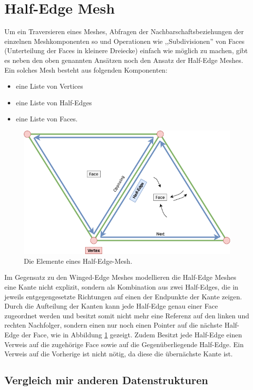\section{Half-Edge Mesh}
Um ein Traversieren eines Meshes, Abfragen der Nachbarschaftsbeziehungen der einzelnen Meshkomponenten so und Operationen wie ,,Subdivisionen'' von Faces (Unterteilung der Faces in kleinere Dreiecke) einfach wie m\"oglich zu machen, gibt es neben den oben genannten Ans\"atzen noch den Ansatz der Half-Edge Meshes. Ein solches Mesh besteht aus folgenden Komponenten:
\begin{itemize}
	\item eine Liste von Vertices
	\item eine Liste von Half-Edges
	\item eine Liste von Faces.
\end{itemize}

\begin{figure}[h]
	\centering
	\includegraphics[width=0.7\linewidth]{Images/half-edge-mesh}
	\caption[Half-Edge-Mesh Schematik]{Die Elemente eines Half-Edge-Mesh.}
	\label{fig:half-edge-mesh}
\end{figure}

Im Gegensatz zu den Winged-Edge Meshes modellieren die Half-Edge Meshes eine Kante nicht explizit, sondern als Kombination aus zwei Half-Edges, die in jeweils entgegengesetzte Richtungen auf einen der Endpunkte der Kante zeigen. Durch die Aufteilung der Kanten kann jede Half-Edge genau einer Face zugeordnet werden und besitzt somit nicht mehr eine Referenz auf den linken und rechten Nachfolger, sondern einen nur noch einen Pointer auf die n\"achste Half-Edge der Face, wie in Abbildung \ref{fig:half-edge-mesh} gezeigt. Zudem Besitzt jede Half-Edge einen Verweis auf die zugeh\"orige Face sowie auf die Gegen\"uberliegende Half-Edge. Ein Verweis auf die Vorherige ist nicht n\"otig, da diese die \"ubern\"achste Kante ist. 

\subsection{Vergleich mir anderen Datenstrukturen}
\subsection{}